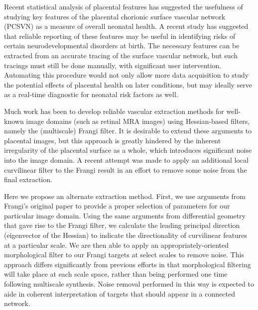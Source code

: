 

Recent statistical analysis of placental features has suggested the usefulness of studying key features of the placental chorionic surface vascular network (PCSVN) as a measure of overall neonatal health. A recent study has suggested that reliable reporting of these features may be useful in identifying risks of certain neurodevelopmental disorders at birth. The necessary features can be extracted from an accurate tracing of the surface vascular network, but such tracings must still be done manually, with significant user intervention. Automating this procedure would not only allow more data acquisition to study the potential effects of placental health on later conditions, but may ideally serve as a real-time diagnostic for neonatal risk factors as well.

Much work has been to develop reliable vascular extraction methods for well-known image domains (such as retinal MRA images) using Hessian-based filters, namely the (multiscale) Frangi filter. It is desirable to extend these arguments to placental images, but this approach is greatly hindered by the inherent irregularity of the placental surface as a whole, which introduces significant noise into the image domain.  A recent attempt was made to apply an additional local curvilinear filter to the Frangi result in an effort to remove some noise from the final extraction.

Here we propose an alternate extraction method. First, we use arguments from Frangi’s original paper to provide a proper selection of parameters for our particular image domain. Using the same arguments from differential geometry that gave rise to the Frangi filter, we calculate the leading principal direction (eigenvector of the Hessian) to indicate the directionality of curvilinear features at a particular scale. We are then able to apply an appropriately-oriented morphological filter to our Frangi targets at select scales to remove noise. This approach differs significantly from previous efforts in that morphological filtering will take place at each scale space, rather than being performed one time following multiscale synthesis. Noise removal performed in this way is expected to aide in coherent interpretation of targets that should appear in a connected network.

